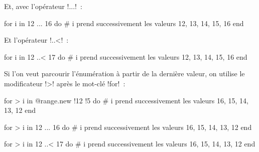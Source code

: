 Et, avec l'opérateur \ggst!...!~:
\begin{galgas3}
for i in 12 ... 16 do
  # i prend successivement les valeurs 12, 13, 14, 15, 16
end
\end{galgas3}

Et l'opérateur \ggst!..<!~:
\begin{galgas3}
for i in 12 ..< 17 do
  # i prend successivement les valeurs 12, 13, 14, 15, 16
end
\end{galgas3}

Si l'on veut parcourir l'énumération à partir de la dernière valeur, on utilise le modificateur \ggst!>! après le mot-clé \ggst!for!~:
\begin{galgas3}
for > i in @range.new {!12 !5} do
  # i prend successivement les valeurs 16, 15, 14, 13, 12
end
\end{galgas3}

\begin{galgas3}
for > i in 12 ... 16 do
  # i prend successivement les valeurs 16, 15, 14, 13, 12
end
\end{galgas3}

\begin{galgas3}
for > i in 12 ..< 17 do
  # i prend successivement les valeurs 16, 15, 14, 13, 12
end
\end{galgas3}


